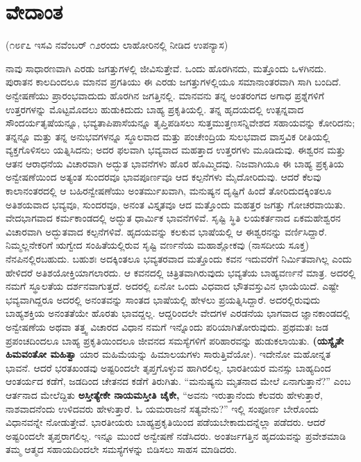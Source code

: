 
\chapter{ವೇದಾಂತ}

\begin{center}
(೧೮೯೭ ಇಸವಿ ನವೆಂಬರ್​ ೧೨ರಂದು ಲಾಹೋರಿನಲ್ಲಿ ನೀಡಿದ ಉಪನ್ಯಾಸ)
\end{center}

ನಾವು ಸಾಧಾರಣವಾಗಿ ಎರಡು ಜಗತ್ತುಗಳಲ್ಲಿ ಜೀವಿಸುತ್ತೇವೆ. ಒಂದು ಹೊರಗಿನದು, ಮತ್ತೊಂದು ಒಳಗಿನದು. ಪುರಾತನ ಕಾಲದಿಂದಲೂ ಮಾನವ ಪ್ರಗತಿಯು ಈ ಎರಡು ಜಗತ್ತುಗಳಲ್ಲಿಯೂ ಸಮಾನಾಂತರವಾಗಿ ಸಾಗಿ ಬಂದಿದೆ. ಅನ್ವೇಷಣೆಯು ಪ್ರಾರಂಭವಾದುದು ಹೊರಗಿನ ಜಗತ್ತಿನಲ್ಲಿ. ಮಾನವನು ತನ್ನ ಅಂತರಂಗದ ಅಗಾಧ ಪ್ರಶ್ನೆಗಳಿಗೆ ಉತ್ತರಗಳನ್ನು ಮೊಟ್ಟಮೊದಲು ಹುಡುಕಿದುದು ಬಾಹ್ಯ ಪ್ರಕೃತಿಯಲ್ಲಿ. ತನ್ನ ಹೃದಯದಲ್ಲಿ ಉತ್ಪನ್ನವಾದ ಸೌಂದರ್ಯ\-ತೃಷೆಯನ್ನೂ, ಭವ್ಯತಾಪಿಪಾಸೆಯನ್ನೂ ತೃಪ್ತಿಪಡಿಸಲು ಸುತ್ತಮುತ್ತಣ\break ಸನ್ನಿವೇಶದ ಸಹಾಯವನ್ನು ಕೋರಿದನು; ತನ್ನನ್ನೂ ಮತ್ತು ತನ್ನ ಅನುಭವಗಳನ್ನೂ ಸ್ಥೂಲವಾದ ಮತ್ತು ಪಂಚೇಂದ್ರಿಯ ಸುಲಭವಾದ ವಾಸ್ತವಿಕ ರೀತಿಯಲ್ಲಿ ವ್ಯಕ್ತಗೊಳಿಸಲು ಯತ್ನಿಸಿದನು; ಅದರ ಫಲವಾಗಿ ಭವ್ಯವಾದ ಮಹತ್ತಾದ ಉತ್ತರಗಳು ಮೂಡಿದುವು. ಈಶ್ವರನ ಮತ್ತು ಆತನ ಆರಾಧನೆಯ ವಿಚಾರವಾಗಿ ಅದ್ಭುತ ಭಾವನೆಗಳು ಹೊರ ಹೊಮ್ಮಿದವು. ನಿಜವಾಗಿಯೂ ಈ ಬಾಹ್ಯ ಪ್ರಕೃತಿಯ ಅನ್ವೇಷಣೆಯಿಂದ ಅತ್ಯಂತ ಸುಂದರವೂ ಭಾವಪೂರ್ಣವೂ ಆದ ಕಲ್ಪನೆಗಳು ಮೈದೋರಿದುವು. ಆದರೆ ಕೆಲವು ಕಾಲಾನಂತರದಲ್ಲಿ ಆ ಬಹಿರನ್ವೇಷಣೆಯು ಅಂತರ್ಮುಖವಾಗಿ, ಮನುಷ್ಯನ ದೃಷ್ಟಿಗೆ ಹಿಂದೆ ತೋರಿದುದಕ್ಕಿಂತಲೂ ಅತಿಶಯವಾದ ಭವ್ಯವೂ, ಸುಂದರವೂ, ಅನಂತ ವಿಸ್ತೃತವೂ ಆದ ಮತ್ತೊಂದು ಮಹತ್ತರ ಜಗತ್ತು ಗೋಚರವಾಯಿತು. ವೇದಭಾಗವಾದ ಕರ್ಮಕಾಂಡದಲ್ಲಿ ಅದ್ಭುತ ಧಾರ್ಮಿಕ ಭಾವನೆಗಳಿವೆ. ಸೃಷ್ಟಿ ಸ್ಥಿತಿ ಲಯಕರ್ತನಾದ ಏಕಮಹೇಶ್ವರನ ವಿಚಾರವಾಗಿ ಅದ್ಭುತವಾದ ಕಲ್ಪನೆಗಳಿವೆ. ಹೃದಯವನ್ನು ಕಲಕುವ ಭಾಷೆಯಲ್ಲಿ ಆ ಈಶ್ವರನನ್ನು ವರ್ಣಿಸಿದ್ದಾರೆ. ನಿಮ್ಮಲ್ಲನೇಕರಿಗೆ ಋಗ್ವೇದ ಸಂಹಿತೆಯಲ್ಲಿರುವ ಸೃಷ್ಟಿ ವರ್ಣನೆಯ ಮಹಾಶ್ಲೋಕವು (ನಾಸದೀಯ ಸೂಕ್ತ) ನೆನಪಿನಲ್ಲಿರಬಹುದು. ಬಹುಶಃ ಅದಕ್ಕಿಂತಲೂ ಭವ್ಯತರವಾದ ಮತ್ತೊಂದು ಕವನ ಇದುವರೆಗೆ ನಿರ್ಮಿತವಾಗಿಲ್ಲ ಎಂದು ಹೇಳಿದರೆ ಅತಿಶಯೋಕ್ತಿಯಾಗಲಾರದು. ಆ ಕವನದಲ್ಲಿ ಚಿತ್ರಿತವಾಗಿರುವುದು ಭವ್ಯತೆಯ ಬಾಹ್ಯವರ್ಣನೆ ಮಾತ್ರ. ಅದರಲ್ಲಿ ನಮಗೆ ಸ್ಥೂಲತೆಯ ದರ್ಶನವಾಗುತ್ತದೆ. ಅದರಲ್ಲಿ ಏನೋ ಒಂದು ವಿಧವಾದ ಭೌತವಸ್ತುವಿನ ಛಾಯೆಯಿದೆ. ಎಷ್ಟೇ ಭವ್ಯವಾಗಿದ್ದರೂ ಅದರಲ್ಲಿ ಅನಂತವನ್ನು ಸಾಂತದ ಭಾಷೆಯಲ್ಲಿ ಹೇಳಲು ಪ್ರಯತ್ನಿಸಿದ್ದಾರೆ. ಅದರಲ್ಲಿರುವುದು ಬಾಹ್ಯಶಕ್ತಿಯ ಅನಂತತೆಯೇ ಹೊರತು ಭಾವದ್ದಲ್ಲ. ಆದ್ದರಿಂದಲೇ ವೇದಗಳ ಎರಡನೆಯ ಭಾಗವಾದ ಜ್ಞಾನಕಾಂಡದಲ್ಲಿ ಅನ್ವೇಷಣೆಯ ಅಥವಾ ತತ್ತ್ವ ವಿಚಾರದ ವಿಧಾನ ನಮಗೆ ಇನ್ನೊಂದು ಪರಿಯಾಗಿತೋರುವುದು. ಪ್ರಥಮತಃ ಜಡ ಪ್ರಪಂಚದಿಂದಲೂ ಬಾಹ್ಯ ಪ್ರಕೃತಿಯಿಂದಲೂ ಜೀವನದ ಸಮಸ್ಯೆಗಳಿಗೆ ಪರಿಹಾರವನ್ನು ಹುಡುಕಲಾಯಿತು. \textbf{(ಯಸ್ಯೈತೇ ಹಿಮವಂತೋ ಮಹಿತ್ವಾ} ಯಾರ ಮಹಿಮೆಯನ್ನು ಹಿಮಾಲಯಗಳು ಸಾರುತ್ತಿವೆಯೋ). ಇದೇನೋ ಮಹೋನ್ನತ ಭಾವನೆ. ಆದರೆ ಭರತಖಂಡವು ಅಷ್ಟರಿಂದಲೇ ತೃಪ್ತಗೊಳ್ಳುವ ಹಾಗಿರಲಿಲ್ಲ. ಭಾರತೀಯರ ಮನಸ್ಸು ಬಾಹ್ಯದಿಂದ ಆಂತರ್ಯದ ಕಡೆಗೆ, ಜಡದಿಂದ ಚೇತನದ ಕಡೆಗೆ ತಿರುಗಿತು. “ಮನುಷ್ಯನು ಮೃತನಾದ ಮೇಲೆ ಏನಾಗು\-ತ್ತಾನೆ?” ಎಂಬ ಆರ್ತನಾದ ಮೇಲೆದ್ದಿತು \textbf{ಅಸ್ತೀತ್ಯೇಕೇ ನಾಯಮಸ್ತೀತಿ ಚೈಕೇ,} “ಅವನು ಇರುತ್ತಾನೆಂದು ಕೆಲವರು ಹೇಳುತ್ತಾರೆ, ನಾಶವಾದನೆಂದು ಉಳಿದವರು ಹೇಳುತ್ತಾರೆ. ಓ ಯಮರಾಜನೆ ಸತ್ಯವೇನು?” ಇಲ್ಲಿ ಸಂಪೂರ್ಣ ಬೇರೊಂದು ವಿಧಾನವನ್ನೇ ನೋಡುತ್ತೇವೆ. ಭಾರತೀಯರು ಬಾಹ್ಯಪ್ರಕೃತಿಯಿಂದ ಪಡೆಯಬೇಕಾದುದನ್ನೆಲ್ಲಾ ಪಡೆದರು. ಆದರೆ ಅಷ್ಟರಿಂದಲೇ ತೃಪ್ತರಾಗಲಿಲ್ಲ. ಇನ್ನೂ ಮುಂದೆ ಅನ್ವೇಷಣೆ ನಡೆಸಿದರು. ಅಂತರ್ಜಗತ್ತಿನ ಹೃದಯವನ್ನು ಪ್ರವೇಶಮಾಡಿ ತಮ್ಮ ಆತ್ಮದ ಸಹಾಯದಿಂದಲೇ ಸಮಸ್ಯೆಗಳನ್ನು ಬಿಡಿಸಲು ಸಾಹಸ ಮಾಡಿದರು.


